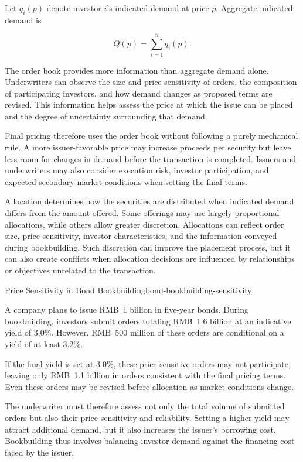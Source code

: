 Let $q_i(p)$ denote investor $i$'s indicated demand at price $p$. Aggregate indicated demand is

\begin{equation}
Q(p)=\sum_{i=1}^{n} q_i(p).
\label{eq:ch13-bookbuilding-demand}
\end{equation}

The order book provides more information than aggregate demand alone. Underwriters can observe the size and price sensitivity of orders, the composition of participating investors, and how demand changes as proposed terms are revised. This information helps assess the price at which the issue can be placed and the degree of uncertainty surrounding that demand.

Final pricing therefore uses the order book without following a purely mechanical rule. A more issuer-favorable price may increase proceeds per security but leave less room for changes in demand before the transaction is completed. Issuers and underwriters may also consider execution risk, investor participation, and expected secondary-market conditions when setting the final terms.

Allocation determines how the securities are distributed when indicated demand differs from the amount offered. Some offerings may use largely proportional allocations, while others allow greater discretion. Allocations can reflect order size, price sensitivity, investor characteristics, and the information conveyed during bookbuilding. Such discretion can improve the placement process, but it can also create conflicts when allocation decisions are influenced by relationships or objectives unrelated to the transaction.

\begin{example}{Price Sensitivity in Bond Bookbuilding}{bond-bookbuilding-sensitivity}

A company plans to issue RMB~1 billion in five-year bonds. During
bookbuilding, investors submit orders totaling RMB~1.6 billion
at an indicative yield of 3.0\%. However, RMB~500 million of
these orders are conditional on a yield of at least 3.2\%.

If the final yield is set at 3.0\%, these price-sensitive orders
may not participate, leaving only RMB~1.1 billion in orders
consistent with the final pricing terms. Even these orders may
be revised before allocation as market conditions change.

The underwriter must therefore assess not only the total volume
of submitted orders but also their price sensitivity and
reliability. Setting a higher yield may attract additional
demand, but it also increases the issuer's borrowing cost.
Bookbuilding thus involves balancing investor demand against
the financing cost faced by the issuer.
\end{example}

